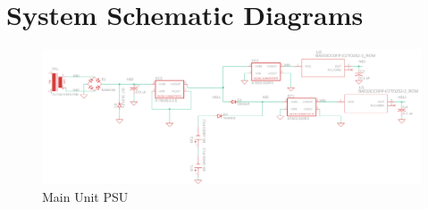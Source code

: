 \section{System Schematic Diagrams}
\begin{landscape}
  \begin{center}
  \begin{figure}[H]
    \centering \includegraphics[height=0.6\textheight]{../Power-Supply/Main Unit PSU/main-unit-psu.png}
    \caption{Main Unit PSU}
    \label{fig:main-psu}
  \end{figure}
  \end{center}
\end{landscape}

